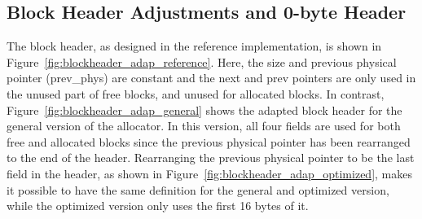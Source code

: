 \subsection{Block Header Adjustments and 0-byte Header}
\label{sec:adaptations_impl:0-byte-header}

The block header, as designed in the reference implementation, is shown in Figure~\ref{fig:blockheader_adap_reference}. Here, the size and previous physical pointer (prev\_phys) are constant and the next and prev pointers are only used in the unused part of free blocks, and unused for allocated blocks. In contrast, Figure~\ref{fig:blockheader_adap_general} shows the adapted block header for the general version of the allocator. In this version, all four fields are used for both free and allocated blocks since the previous physical pointer has been rearranged to the end of the header. Rearranging the previous physical pointer to be the last field in the header, as shown in Figure~\ref{fig:blockheader_adap_optimized}, makes it possible to have the same definition for the general and optimized version, while the optimized version only uses the first 16 bytes of it.

